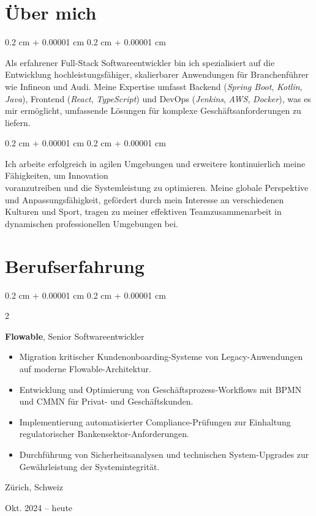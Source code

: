 \documentclass[11pt, letterpaper]{article}
\newenvironment{highlights}{
    \begin{itemize}[
        topsep=0.10 cm,
        parsep=0.10 cm,
        partopsep=0pt,
        itemsep=0pt,
        leftmargin=0.4 cm + 10pt
    ]
}{
    \end{itemize}
} %
\newenvironment{onecolentry}{
    \begin{adjustwidth}{
        0.2 cm + 0.00001 cm
    }{
        0.2 cm + 0.00001 cm
    }
}{
    \end{adjustwidth}
} %
\newenvironment{twocolentry}[2][]{
    \onecolentry
    \def\secondColumn{#2}
    \setcolumnwidth{\fill, 4.5 cm}
    \begin{paracol}{2}
}{
    \switchcolumn \raggedleft \secondColumn
    \end{paracol}
    \endonecolentry
} %
\let\hrefWithoutArrow\href
\renewcommand{\href}[2]{\hrefWithoutArrow{#1}{\mbox{\ifthenelse{\equal{#2}{}}{ }{#2 }\raisebox{.15ex}{\footnotesize \faExternalLink*}}}}
\begin{document}
    \section{Über mich}
\begin{onecolentry}
    Als erfahrener Full-Stack Softwareentwickler bin ich spezialisiert auf die Entwicklung hochleistungsfähiger, skalierbarer Anwendungen für Branchenführer wie Infineon und Audi. Meine Expertise umfasst Backend (\textit{Spring Boot}, \textit{Kotlin}, \textit{Java}), Frontend (\textit{React}, \textit{TypeScript}) und DevOps (\textit{Jenkins}, \textit{AWS}, \textit{Docker}), was es mir ermöglicht, umfassende Lösungen für komplexe Geschäftsanforderungen zu liefern.
\end{onecolentry}
\vspace{0.1 cm}
\begin{onecolentry}
    Ich arbeite erfolgreich in agilen Umgebungen und erweitere kontinuierlich meine Fähigkeiten, um Innovation \\ voranzutreiben und die Systemleistung zu optimieren. Meine globale Perspektive und Anpassungsfähigkeit, gefördert durch mein Interesse an verschiedenen Kulturen und Sport, tragen zu meiner effektiven Teamzusammenarbeit in dynamischen professionellen Umgebungen bei.
\end{onecolentry}
    
    \section{Berufserfahrung}

\begin{twocolentry}{
    Zürich, Schweiz
    
    Okt. 2024 – heute  
}
\textbf{Flowable}, Senior Softwareentwickler  
\begin{highlights}  
    \item Migration kritischer \href{https://ubs.com}{UBS}  Kundenonboarding-Systeme von Legacy-Anwendungen auf moderne Flowable-Architektur.
    \item Entwicklung und Optimierung von Geschäftsprozess-Workflows mit BPMN und CMMN für Privat- und Geschäftskunden.
    \item Implementierung automatisierter Compliance-Prüfungen zur Einhaltung regulatorischer Bankensektor-Anforderungen.
    \item Durchführung von Sicherheitsanalysen und technischen System-Upgrades zur Gewährleistung der Systemintegrität.
\end{highlights}  
\end{twocolentry}
\end{document}
